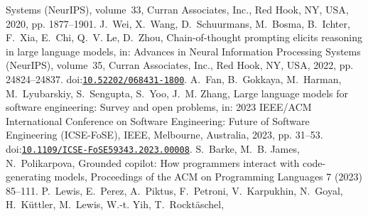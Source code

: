 \documentclass[10pt,a4paper]{article}
\providecommand{\bibinfo}[2]{#2}
\providecommand{\DOIprefix}{doi:}
\providecommand{\doi}[1]{\href{https://doi.org/#1}{\nolinkurl{#1}}}
\begin{document}
\begin{thebibliography}{25}
{  Systems (NeurIPS)}, volume~\bibinfo{volume}{33}, \bibinfo{publisher}{Curran
  Associates, Inc.}, \bibinfo{address}{Red Hook, NY, USA},
  \bibinfo{year}{2020}, pp. \bibinfo{pages}{1877--1901}.
\bibinfo{author}{J.~Wei}, \bibinfo{author}{X.~Wang},
  \bibinfo{author}{D.~Schuurmans}, \bibinfo{author}{M.~Bosma},
  \bibinfo{author}{B.~Ichter}, \bibinfo{author}{F.~Xia},
  \bibinfo{author}{E.~Chi}, \bibinfo{author}{Q.~V. Le},
  \bibinfo{author}{D.~Zhou},
\newblock \bibinfo{title}{Chain-of-thought prompting elicits reasoning in large
  language models},
\newblock in: \bibinfo{booktitle}{Advances in Neural Information Processing
  Systems (NeurIPS)}, volume~\bibinfo{volume}{35}, \bibinfo{publisher}{Curran
  Associates, Inc.}, \bibinfo{address}{Red Hook, NY, USA},
  \bibinfo{year}{2022}, pp. \bibinfo{pages}{24824--24837}.
  \DOIprefix\doi{10.52202/068431-1800}.
\bibinfo{author}{A.~Fan}, \bibinfo{author}{B.~Gokkaya},
  \bibinfo{author}{M.~Harman}, \bibinfo{author}{M.~Lyubarskiy},
  \bibinfo{author}{S.~Sengupta}, \bibinfo{author}{S.~Yoo},
  \bibinfo{author}{J.~M. Zhang},
\newblock \bibinfo{title}{Large language models for software engineering:
  Survey and open problems},
\newblock in: \bibinfo{booktitle}{2023 IEEE/ACM International Conference on
  Software Engineering: Future of Software Engineering (ICSE-FoSE)},
  \bibinfo{publisher}{IEEE}, \bibinfo{address}{Melbourne, Australia},
  \bibinfo{year}{2023}, pp. \bibinfo{pages}{31--53}.
  \DOIprefix\doi{10.1109/ICSE-FoSE59343.2023.00008}.
\bibinfo{author}{S.~Barke}, \bibinfo{author}{M.~B. James},
  \bibinfo{author}{N.~Polikarpova},
\newblock \bibinfo{title}{Grounded copilot: How programmers interact with
  code-generating models},
\newblock \bibinfo{journal}{Proceedings of the ACM on Programming Languages}
  \bibinfo{volume}{7} (\bibinfo{year}{2023}) \bibinfo{pages}{85--111}.
\bibinfo{author}{P.~Lewis}, \bibinfo{author}{E.~Perez},
  \bibinfo{author}{A.~Piktus}, \bibinfo{author}{F.~Petroni},
  \bibinfo{author}{V.~Karpukhin}, \bibinfo{author}{N.~Goyal},
  \bibinfo{author}{H.~K{\"u}ttler}, \bibinfo{author}{M.~Lewis},
  \bibinfo{author}{W.-t. Yih}, \bibinfo{author}{T.~Rockt{\"a}schel},

\end{thebibliography}
\end{document}
